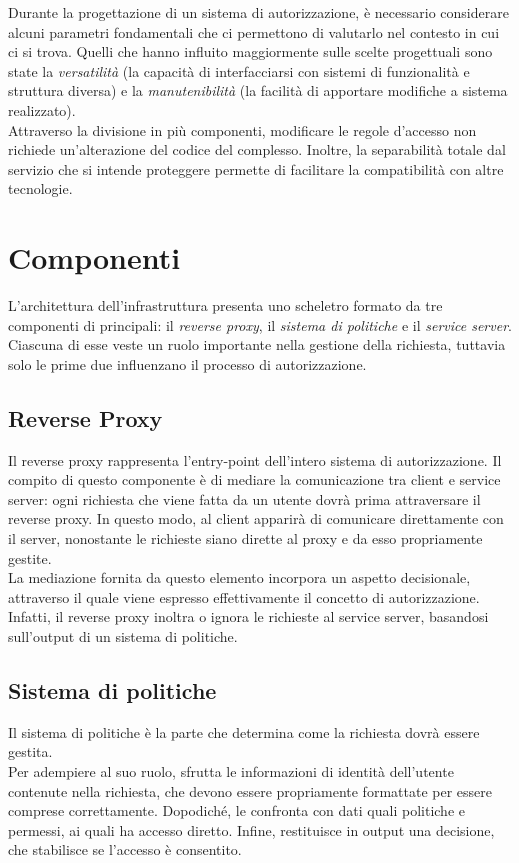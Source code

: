 Durante la progettazione di un sistema di autorizzazione, è necessario considerare alcuni parametri fondamentali che ci permettono di valutarlo 
nel contesto in cui ci si trova.
Quelli che hanno influito maggiormente sulle scelte progettuali sono state la \textit{versatilità} (la capacità di interfacciarsi con sistemi di 
funzionalità e struttura diversa)
e la \textit{manutenibilità} (la facilità di apportare modifiche a sistema realizzato).
\\ Attraverso la divisione in più componenti, modificare le regole d'accesso non richiede un'alterazione del codice del
complesso. Inoltre, la separabilità totale dal servizio che si intende proteggere permette di facilitare la compatibilità con altre tecnologie.   

\section{Componenti}

L'architettura dell'infrastruttura presenta uno scheletro formato da tre componenti di principali: il \textit{reverse proxy}, il \textit{sistema di politiche} e il \textit{service server}. 
Ciascuna di esse veste un ruolo importante nella gestione della richiesta, tuttavia solo le prime due influenzano il processo di autorizzazione. 

\subsection{Reverse Proxy}
Il reverse proxy rappresenta l'entry-point dell'intero sistema di autorizzazione. Il compito di questo componente è di
mediare la comunicazione tra client e service server: ogni richiesta che viene fatta da un utente dovrà prima attraversare il reverse proxy. 
In questo modo, al client apparirà di comunicare direttamente con il server, nonostante le richieste siano dirette al proxy e da esso propriamente gestite. 
\\ La mediazione fornita da questo elemento incorpora un aspetto decisionale, attraverso il quale viene espresso effettivamente il concetto di autorizzazione. 
Infatti, il reverse proxy inoltra o ignora le richieste al service server, basandosi sull'output di un sistema di politiche.  
 
\subsection{Sistema di politiche}
Il sistema di politiche è la parte che determina come la richiesta dovrà essere gestita. 
\\ Per adempiere al suo ruolo, sfrutta le informazioni di identità dell'utente contenute nella richiesta, che devono essere propriamente formattate per essere comprese correttamente. 
Dopodiché, le confronta con dati quali politiche e permessi, ai quali ha accesso diretto.
Infine, restituisce in output una decisione, che stabilisce se l'accesso è consentito.  

